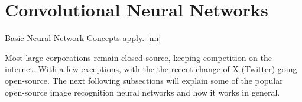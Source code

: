 \section{Convolutional Neural Networks}\label{cnn}
Basic Neural Network Concepts apply. \ref{nn} 

Most large corporations remain closed-source, keeping competition on the internet. With a few exceptions, with the the recent change of X (Twitter) going open-source. The next following subsections will explain some of the popular open-source image recognition neural networks and how it works in general.

